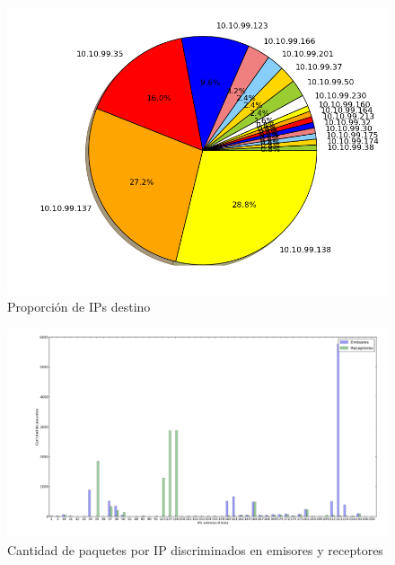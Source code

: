 \begin{figure}[!h]
  \includegraphics[width=\textwidth,keepaspectratio]{graph/receptores_somodi.png}
  \caption{Proporción de IPs destino}
  \label{fig:torta-receptor-inv}
\end{figure}

\begin{figure}[!h]
  \includegraphics[width=\textwidth,keepaspectratio]{graph/barras-invgate.png}
  \caption{Cantidad de paquetes por IP discriminados en emisores y receptores}
  \label{fig:barras-inv}
\end{figure}

